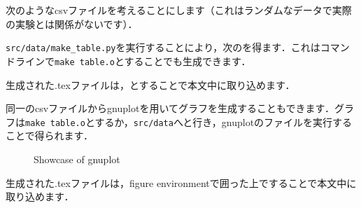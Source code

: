 次のようなcsvファイルを考えることにします（これはランダムなデータで実際の実験とは関係がないです）．

\verb|src/data/make_table.py|を実行することにより，次のを得ます．これはコマンドラインで\verb|make table.o|とすることでも生成できます．

生成された.texファイルは，\verb||とすることで本文中に取り込めます．


同一のcsvファイルからgnuplotを用いてグラフを生成することもできます．グラフは\verb|make table.o|とするか，\verb|src/data|へと行き，gnuplotのファイルを実行することで得られます．
\begin{figure}[H]\centering
  
  \caption{Showcase of gnuplot}
  \label{fig:showcase}
\end{figure}
生成された.texファイルは，figure environmentで囲った上で\verb||することで本文中に取り込めます．

